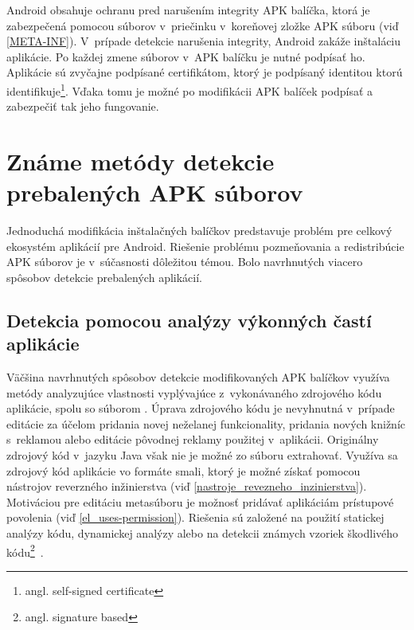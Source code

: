 Android obsahuje ochranu pred narušením integrity APK balíčka, ktorá je zabezpečená pomocou súborov v~priečinku  v~koreňovej zložke APK súboru (viď \ref{META-INF}). V~prípade detekcie narušenia integrity, Android zakáže inštaláciu aplikácie. Po každej zmene súborov v~APK balíčku je nutné podpísať ho. Aplikácie sú zvyčajne podpísané certifikátom, ktorý je podpísaný identitou ktorú identifikuje\footnote{angl. self-signed certificate}. Vďaka tomu je možné po modifikácii APK balíček podpísať a zabezpečiť tak jeho fungovanie.

\section{Známe metódy detekcie prebalených APK súborov}
Jednoduchá modifikácia inštalačných balíčkov predstavuje problém pre celkový ekosystém aplikácií pre Android. Riešenie problému pozmeňovania a redistribúcie APK súborov je v~súčasnosti dôležitou témou. Bolo navrhnutých viacero spôsobov detekcie prebalených aplikácií. 

\subsection{Detekcia pomocou analýzy výkonných častí aplikácie}
Väčšina navrhnutých spôsobov detekcie modifikovaných APK balíčkov využíva metódy analyzujúce vlastnosti vyplývajúce z~vykonávaného zdrojového kódu aplikácie, spolu so súborom . Úprava zdrojového kódu je nevyhnutná v~prípade editácie za účelom pridania novej neželanej funkcionality, pridania nových knižníc s~reklamou alebo editácie pôvodnej reklamy použitej v~aplikácii. Originálny zdrojový kód v~jazyku Java však nie je možné zo súboru  extrahovať. Využíva sa zdrojový kód aplikácie vo formáte smali, ktorý je možné získať pomocou nástrojov reverzného inžinierstva (viď \ref{nastroje_revezneho_inzinierstva}). Motiváciou pre editáciu metasúboru  je možnosť pridávať aplikáciám prístupové povolenia (viď \ref{el_uses-permission}).
Riešenia sú založené na použití statickej analýzy kódu, dynamickej analýzy alebo na detekcii známych vzoriek škodlivého kódu\footnote{angl. signature based}~\cite{Huang2013,Chen2015,Milanova2005,Levchenko2011,Hanna2013,Zhou2012,Potharaju2012}.
	

